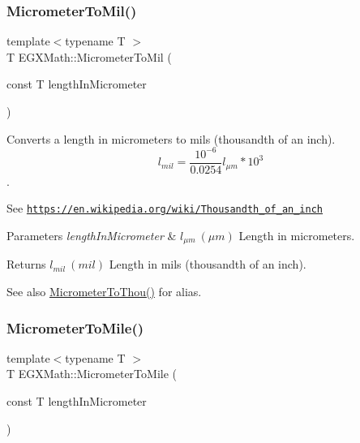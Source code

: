 \subsubsection{\texorpdfstring{Micrometer\+To\+Mil()}{MicrometerToMil()}}
{\footnotesize\ttfamily template$<$typename T $>$ \\
T E\+G\+X\+Math\+::\+Micrometer\+To\+Mil (\begin{DoxyParamCaption}\item[{const T}]{length\+In\+Micrometer }\end{DoxyParamCaption})}



Converts a length in micrometers to mils (thousandth of an inch). \[ l_{mil}= \frac{10^{-6}}{0.0254} l_{\mu m} * 10^{3} \]. 

See \href{https://en.wikipedia.org/wiki/Thousandth_of_an_inch}{\tt https\+://en.\+wikipedia.\+org/wiki/\+Thousandth\+\_\+of\+\_\+an\+\_\+inch} 
\begin{DoxyParams}{Parameters}
{\em length\+In\+Micrometer} & $ l_{\mu m}\ (\mu m)$ Length in micrometers. \\
\hline
\end{DoxyParams}
\begin{DoxyReturn}{Returns}
$ l_{mil}\ (mil)$ Length in mils (thousandth of an inch). 
\end{DoxyReturn}
\begin{DoxySeeAlso}{See also}
\mbox{\hyperlink{group___e_g_x_math-_conversions-_length_conversions-_micrometer-_imperial_ga8a2cfa132c629695ff469f66e1ab5919}{Micrometer\+To\+Thou()}} for alias. 
\end{DoxySeeAlso}
\mbox{\label{group___e_g_x_math-_conversions-_length_conversions-_micrometer-_imperial_ga0419c861d5edc78538ff023c12b9b6d9}} 
\subsubsection{\texorpdfstring{Micrometer\+To\+Mile()}{MicrometerToMile()}}
{\footnotesize\ttfamily template$<$typename T $>$ \\
T E\+G\+X\+Math\+::\+Micrometer\+To\+Mile (\begin{DoxyParamCaption}\item[{const T}]{length\+In\+Micrometer }\end{DoxyParamCaption})}



